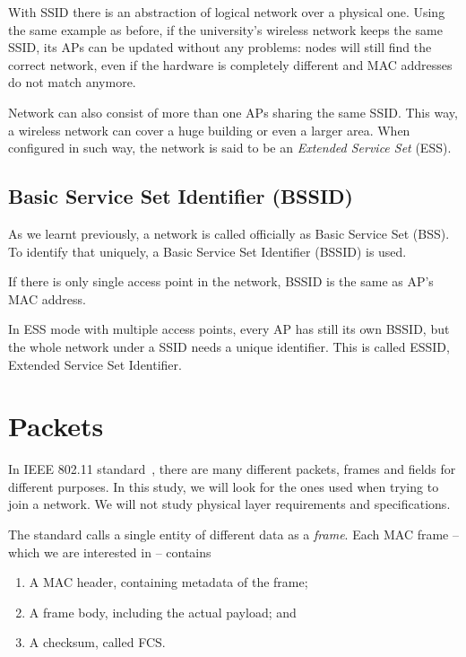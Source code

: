\documentclass[12pt,a4paper,oneside,pdftex]{report}
\begin{document}
With SSID there is an abstraction of logical network over a physical one. Using the same example as before, if the university's wireless network keeps the same SSID, its APs can be updated without any problems: nodes will still find the correct network, even if the hardware is completely different and MAC addresses do not match anymore.

Network can also consist of more than one APs sharing the same SSID. This way, a wireless network can cover a huge building or even a larger area. When configured in such way, the network is said to be an \emph{Extended Service Set} (ESS).~\cite{IEEE802.11}

\subsection{Basic Service Set Identifier (BSSID)}

As we learnt previously, a network is called officially as Basic Service Set (BSS). To identify that uniquely, a Basic Service Set Identifier (BSSID) is used. 

If there is only single access point in the network, BSSID is the same as AP's MAC address. 

In ESS mode with multiple access points, every AP has still its own BSSID, but the whole network under a SSID needs a unique identifier. This is called ESSID, Extended Service Set Identifier.


\section{Packets}
\label{sec:packets_format}

In IEEE 802.11 standard~\cite{IEEE802.11}, there are many different packets, frames and fields for different purposes. In this study, we will look for the ones used when trying to join a network. We will not study physical layer requirements and specifications.

The standard calls a single entity of different data as a \emph{frame}. Each MAC frame -- which we are interested in -- contains

\begin{enumerate}
    \item A MAC header, containing metadata of the frame;
    \item A frame body, including the actual payload; and
    \item A checksum, called FCS.
\end{enumerate}
\end{document}
